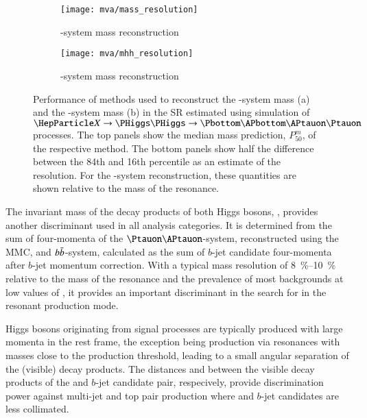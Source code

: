 \begin{figure}[htbp]
  \centering

  \begin{subfigure}[t]{.5\textwidth}
    \centering
    \texttt{[image: mva/mass\_resolution]}
    \caption{\PHiggs-system mass reconstruction}
    \label{fig:mass_reconstruction_H}
  \end{subfigure}\hfill%
  \begin{subfigure}[t]{.5\textwidth}
    \centering
    \texttt{[image: mva/mhh\_resolution]}
    \caption{\HH-system mass reconstruction}
    \label{fig:mass_reconstruction_HH}
  \end{subfigure}

  \caption{Performance of methods used to reconstruct the
    \PHiggs-system mass (a) and the \HH-system mass (b) in the \hadhad
    SR estimated using simulation of $\PX \ra \HH \ra \bbtautau$
    processes. The top panels show the median mass prediction,
    $P_{50}^{m}$, of the respective method. The bottom panels show
    half the difference between the 84th and 16th percentile as an
    estimate of the resolution. For the \HH-system reconstruction,
    these quantities are shown relative to the mass of the resonance.}
  \label{fig:mass_reconstruction}
\end{figure}

The invariant mass of the decay products of both Higgs bosons, \mHH,
provides another discriminant used in all analysis categories. It is
determined from the sum of four-momenta of the
$\Ptauon\APtauon$-system, reconstructed using the MMC, and
$b\bar{b}$-system, calculated as the sum of $b$-jet candidate
four-momenta after $b$-jet momentum correction. With a typical mass
resolution of \SIrange{8}{10}{\percent} relative to the mass of the
resonance and the prevalence of most backgrounds at low values of
\mHH, it provides an important discriminant in the search for \HH in
the resonant production mode.

Higgs bosons originating from signal processes are typically produced
with large momenta in the \HH rest frame, the exception being \HH
production via resonances with masses close to the \HH production
threshold, leading to a small angular separation of the (visible)
\PHiggs decay products. The distances \dRtautau and \dRbb between the
visible decay products of the \taulepton and $b$-jet candidate pair,
respecively, provide discrimination power against multi-jet and top
pair production where \taulepton and $b$-jet candidates are less
collimated.

